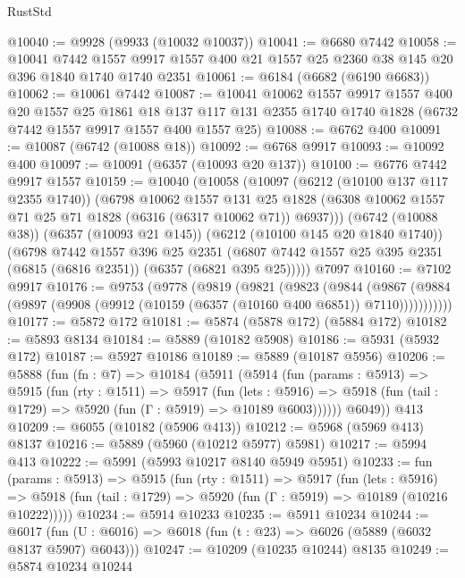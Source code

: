 \begin{lexlean}{RustStd}
\begin{coremodule}
@10040 := @9928 (@9933 (@10032 @10037))
@10041 := @6680 @7442
@10058 := @10041
    @7442
    @1557
    @9917
    @1557
    @400
    @21
    @1557
    @25
    @2360
    @38
    @145
    @20
    @396
    @1840
    @1740
    @1740
    @2351
@10061 := @6184 (@6682 (@6190 @6683))
@10062 := @10061 @7442
@10087 := @10041
    @10062
    @1557
    @9917
    @1557
    @400
    @20
    @1557
    @25
    @1861
    @18
    @137
    @117
    @131
    @2355
    @1740
    @1740
    @1828
    (@6732 @7442 @1557 @9917 @1557 @400 @1557 @25)
@10088 := @6762 @400
@10091 := @10087 (@6742 (@10088 @18))
@10092 := @6768 @9917
@10093 := @10092 @400
@10097 := @10091 (@6357 (@10093 @20 @137))
@10100 := @6776 @7442 @9917 @1557
@10159 := @10040
    (@10058
      (@10097
        (@6212 (@10100 @137 @117 @2355 @1740))
        (@6798
          @10062
          @1557
          @131
          @25
          @1828
          (@6308 @10062 @1557 @71 @25 @71 @1828 (@6316 (@6317 @10062 @71)) @6937)))
      (@6742 (@10088 @38))
      (@6357 (@10093 @21 @145))
      (@6212 (@10100 @145 @20 @1840 @1740))
      (@6798
        @7442
        @1557
        @396
        @25
        @2351
        (@6807 @7442 @1557 @25 @395 @2351 (@6815 (@6816 @2351)) (@6357 (@6821 @395 @25)))))
    @7097
@10160 := @7102 @9917
@10176 := @9753
    (@9778
      (@9819
        (@9821
          (@9823
            (@9844
              (@9867
                (@9884 (@9897 (@9908 (@9912 (@10159 (@6357 (@10160 @400 @6851)) @7110)))))))))))
@10177 := @5872 @172
@10181 := @5874 (@5878 @172) (@5884 @172)
@10182 := @5893 @8134
@10184 := @5889 (@10182 @5908)
@10186 := @5931 (@5932 @172)
@10187 := @5927 @10186
@10189 := @5889 (@10187 @5956)
@10206 := @5888
    (fun (fn : @7) =>
    @10184
      (@5911
        (@5914
          (fun (params : @5913) =>
          @5915
            (fun (rty : @1511) =>
            @5917
              (fun (lets : @5916) =>
              @5918 (fun (tail : @1729) => @5920 (fun (Γ : @5919) => @10189 @6003))))))
        @6049))
    @413
@10209 := @6055 (@10182 (@5906 @413))
@10212 := @5968 (@5969 @413) @8137
@10216 := @5889 (@5960 (@10212 @5977) @5981)
@10217 := @5994 @413
@10222 := @5991 (@5993 @10217 @8140 @5949 @5951)
@10233 := fun (params : @5913) =>
  @5915
    (fun (rty : @1511) =>
    @5917
      (fun (lets : @5916) =>
      @5918 (fun (tail : @1729) => @5920 (fun (Γ : @5919) => @10189 (@10216 @10222)))))
@10234 := @5914 @10233
@10235 := @5911 @10234
@10244 := @6017
    (fun (U : @6016) => @6018 (fun (t : @23) => @6026 (@5889 (@6032 @8137 @5907) @6043)))
@10247 := @10209 (@10235 @10244) @8135
@10249 := @5874 @10234 @10244

\end{coremodule}
\end{lexlean}

